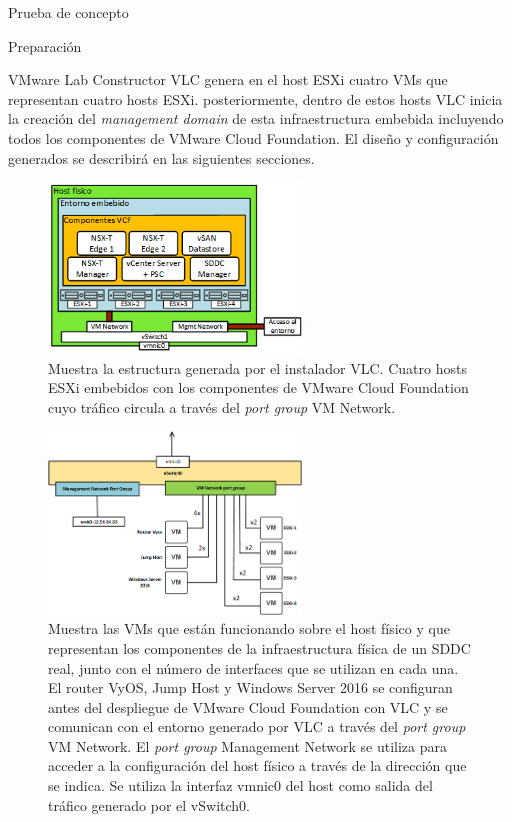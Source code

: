 \begin{section}{Prueba de concepto}
\begin{subsection}{Preparación}
  \begin{subsubsection}{VMware Lab Constructor}
    VLC genera en el host ESXi cuatro VMs que representan cuatro hosts ESXi. posteriormente, dentro de estos hosts VLC inicia la creación del \textit{management domain} de esta infraestructura embebida incluyendo todos los componentes de VMware Cloud Foundation. El diseño y configuración generados se describirá en las siguientes secciones.
    \begin{figure}[h!]
      \centering
      \includegraphics[width=0.6\textwidth]{imaxes/pruebaconcepto/hostFisico.png}
      \caption{Muestra la estructura generada por el instalador VLC. Cuatro hosts ESXi embebidos con los componentes de VMware Cloud Foundation cuyo tráfico circula a través del \textit{port group} VM Network.}
      \label{fig:estructura-generada-por-VLC}
    \end{figure}
    \begin{figure}[h!]
      \centering
      \includegraphics[width=0.6\textwidth]{imaxes/pruebaconcepto/vSwitch0HostFisico.png}
      \caption{Muestra las VMs que están funcionando sobre el host físico y que representan los componentes de la infraestructura física de un SDDC real, junto con el número de interfaces que se utilizan en cada una. El router VyOS, Jump Host y Windows Server 2016 se configuran antes del despliegue de VMware Cloud Foundation con VLC y se comunican con el entorno generado por VLC a través del \textit{port group} VM Network. El \textit{port group} Management Network se utiliza para acceder a la configuración del host físico a través de la dirección que se indica. Se utiliza la interfaz vmnic0 del host como salida del tráfico generado por el vSwitch0.}

\end{figure}
\end{subsubsection}
\end{subsection}
\end{section}
